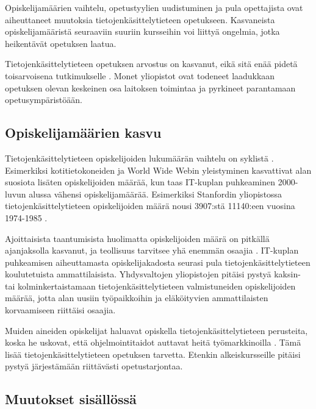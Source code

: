 \documentclass[finnish]{tktltiki2}
\theoremstyle{definition}
\theoremstyle{remark}
\begin{document}
Opiskelijamäärien vaihtelu, opetustyylien uudistuminen ja pula opettajista ovat aiheuttaneet muutoksia tie\-to\-jen\-kä\-sit\-te\-ly\-tie\-teen opetukseen. Kasvaneista opiskelijamääristä seuraaviin suuriin kursseihin voi liittyä ongelmia, jotka heikentävät opetuksen laatua.  \par

Tie\-to\-jen\-kä\-sit\-te\-ly\-tie\-teen opetuksen arvostus on kasvanut, eikä sitä enää pidetä toisarvoisena tutkimukselle \cite{Biggs07}. Monet yliopistot ovat todeneet laadukkaan opetuksen olevan keskeinen osa laitoksen toimintaa ja pyrkineet parantamaan opetusympäristöään. \par


\subsection{Opiskelijamäärien kasvu}
Tietojenkäsittelytieteen opiskelijoiden lukumäärän vaihtelu on syklistä \cite{Roberts11}. Esimerkiksi kotitietokoneiden ja World Wide Webin yleistyminen kasvattivat alan suosiota lisäten opiskelijoiden määrää, kun taas IT-kuplan puhkeaminen 2000-luvun alussa vähensi opiskelijamäärää. Esimerkiksi Stanfordin yliopistossa tietojenkäsittelytieteen opiskelijoiden määrä nousi 3907:stä 11140:een vuosina 1974-1985 \cite{Reges88}.  \par

Ajoittaisista taantumisista huolimatta opiskelijoiden määrä on pitkällä ajanjaksolla kasvanut, ja teollisuus tarvitsee yhä enemmän osaajia \cite{Roberts11}. IT-kuplan puhkeamisen aiheuttamasta opiskelijakadosta seurasi pula tie\-to\-jen\-kä\-sit\-te\-ly\-tie\-teen koulutetuista ammattilaisista. Yhdysvaltojen yliopistojen pitäisi pystyä kaksin- tai kolminkertaistamaan tie\-to\-jen\-kä\-sit\-te\-ly\-tie\-teen valmistuneiden opiskelijoiden määrää, jotta alan uusiin työpaikkoihin ja eläköityvien ammattilaisten korvaamiseen riittäisi osaajia.  \par

Muiden aineiden opiskelijat haluavat opiskella tietojenkäsittelytieteen perusteita, koska he uskovat, että ohjelmointitaidot auttavat heitä työmarkkinoilla \cite{Roberts11}. Tämä lisää tietojenkäsittelytieteen opetuksen tarvetta. Etenkin alkeiskursseille pitäisi pystyä järjestämään riittävästi opetustarjontaa.  \par



\subsection{Muutokset sisällössä}
\end{document}
